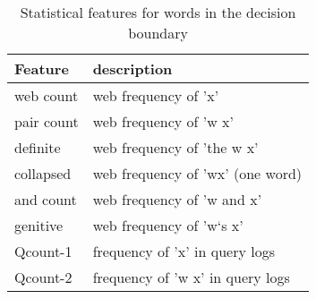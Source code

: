 \begin{table}[t]
 \caption{Statistical features for words in the decision boundary}
 \label{table-statistical-features-bergsma-2007}
 \centering
 \small
 \begin{tabular}{@{}ll@{}}
  \toprule
  Feature & description\\
  \midrule
  web count & web frequency of 'x'\\
  pair count & web frequency of 'w x'\\
  definite & web frequency of 'the w x'\\
  collapsed & web frequency of 'wx' (one word)\\
  and count & web frequency of 'w and x'\\
  genitive & web frequency of 'w`s x'\\
  Qcount-1 & frequency of 'x' in query logs\\
  Qcount-2 & frequency of 'w x' in query logs\\
  \bottomrule
 \end{tabular}
\end{table}

